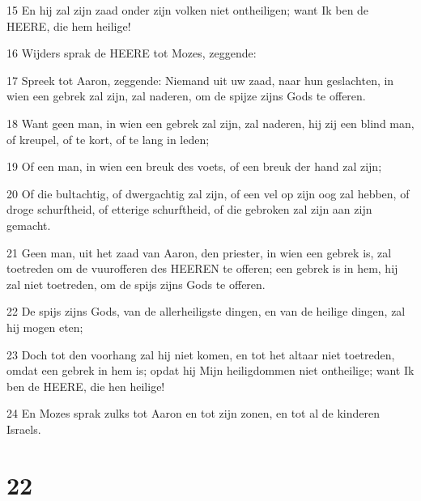 \par 15 En hij zal zijn zaad onder zijn volken niet ontheiligen; want Ik ben de HEERE, die hem heilige!
\par 16 Wijders sprak de HEERE tot Mozes, zeggende:
\par 17 Spreek tot Aaron, zeggende: Niemand uit uw zaad, naar hun geslachten, in wien een gebrek zal zijn, zal naderen, om de spijze zijns Gods te offeren.
\par 18 Want geen man, in wien een gebrek zal zijn, zal naderen, hij zij een blind man, of kreupel, of te kort, of te lang in leden;
\par 19 Of een man, in wien een breuk des voets, of een breuk der hand zal zijn;
\par 20 Of die bultachtig, of dwergachtig zal zijn, of een vel op zijn oog zal hebben, of droge schurftheid, of etterige schurftheid, of die gebroken zal zijn aan zijn gemacht.
\par 21 Geen man, uit het zaad van Aaron, den priester, in wien een gebrek is, zal toetreden om de vuurofferen des HEEREN te offeren; een gebrek is in hem, hij zal niet toetreden, om de spijs zijns Gods te offeren.
\par 22 De spijs zijns Gods, van de allerheiligste dingen, en van de heilige dingen, zal hij mogen eten;
\par 23 Doch tot den voorhang zal hij niet komen, en tot het altaar niet toetreden, omdat een gebrek in hem is; opdat hij Mijn heiligdommen niet ontheilige; want Ik ben de HEERE, die hen heilige!
\par 24 En Mozes sprak zulks tot Aaron en tot zijn zonen, en tot al de kinderen Israels.

\chapter{22}

